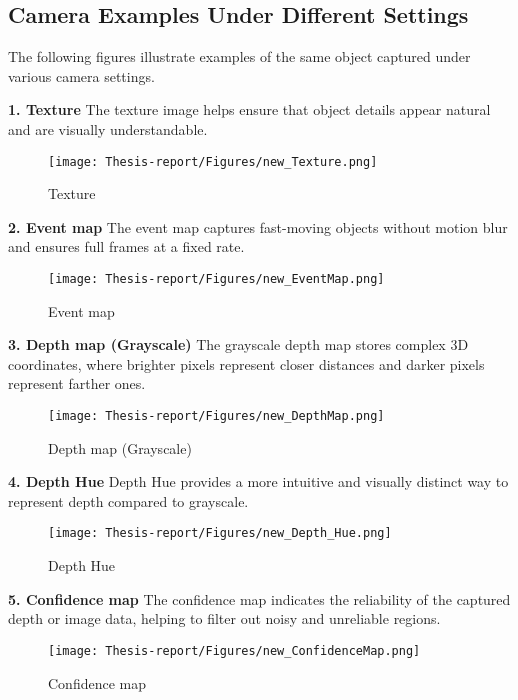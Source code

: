 \documentclass[12pt]{article}
\begin{document}
\subsection{Camera Examples Under Different Settings}

The following figures illustrate examples of the same object captured under various camera settings.

\noindent\textbf{1. Texture} The texture image helps ensure that object details appear natural and are visually understandable.
\begin{figure}[H]
    \centering
    \texttt{[image: Thesis-report/Figures/new\_Texture.png]}
    \caption{Texture}
    \label{fig:texture}
\end{figure}

\noindent\textbf{2. Event map} The event map captures fast-moving objects without motion blur and ensures full frames at a fixed rate.
\begin{figure}[H]
    \centering
    \texttt{[image: Thesis-report/Figures/new\_EventMap.png]}
    \caption{Event map}
    \label{fig:eventmap}
\end{figure}

\noindent\textbf{3. Depth map (Grayscale)} The grayscale depth map stores complex 3D coordinates, where brighter pixels represent closer distances and darker pixels represent farther ones.
\begin{figure}[H]
    \centering
    \texttt{[image: Thesis-report/Figures/new\_DepthMap.png]}
    \caption{Depth map (Grayscale)}
    \label{fig:depthmap_gray}
\end{figure}

\noindent\textbf{4. Depth Hue} Depth Hue provides a more intuitive and visually distinct way to represent depth compared to grayscale.
\begin{figure}[H]
    \centering
    \texttt{[image: Thesis-report/Figures/new\_Depth\_Hue.png]}
    \caption{Depth Hue}
    \label{fig:depth_hue}
\end{figure}

\noindent\textbf{5. Confidence map} The confidence map indicates the reliability of the captured depth or image data, helping to filter out noisy and unreliable regions.
\begin{figure}[H]
    \centering
    \texttt{[image: Thesis-report/Figures/new\_ConfidenceMap.png]}
    \caption{Confidence map}
    \label{fig:confidence_map}
\end{figure}
\end{document}
